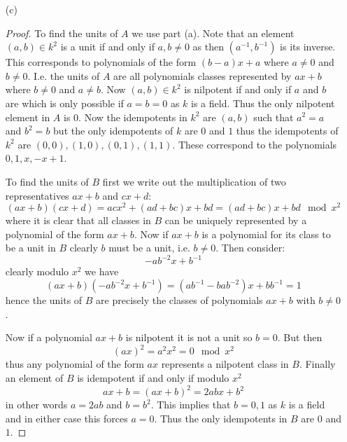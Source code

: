 \documentclass[12pt]{article}
\begin{document}
\begin{enumerate}
\begin{proof}
        Now to find the ideals of $B$ we apply a similar argument only to the polynomial $x^2$
        and from this we find it has monic divisors $1, x, x^2$ corresponding to ideals of $B$
        $(0), (x)/(x^2), B$ where the middle ideal is maximal as
        \[ k \cong k[x]/\langle x\rangle \cong \frac{k[x]/\langle x^2 \rangle}{\langle x \rangle /\langle x^2 \rangle} \cong \frac{B}{\langle x \rangle / \langle x^2 \rangle} \]
        and the other two are neither prime nor maximal. To see that $(0)$ is not prime note that $[x][x] = [x^2] = 0$
        hence $B$ has zero divisors and so $(0)$ cannot be prime.
    \end{proof}

    \item[(c)]
    \begin{proof}
        To find the units of $A$ we use part (a). Note that an element $(a, b) \in k^2$
        is a unit if and only if $a, b \neq 0$ as then $(a^{-1}, b^{-1})$ is its inverse.
        This corresponds to polynomials of the form $(b-a)x + a$ where $a \neq 0$
        and $b \neq 0$. I.e. the units of $A$ are all polynomials classes represented by $ax + b$
        where $b \neq 0$ and $a \neq b$. Now $(a, b) \in k^2$ is nilpotent if and only if $a$ and $b$ are
        which is only possible if $a = b = 0$ as $k$ is a field. Thus the only nilpotent element in $A$
        is $0$. Now the idempotents in $k^2$ are $(a, b)$ such that $a^2 = a$ and $b^2 = b$
        but the only idempotents of $k$ are $0$ and $1$ thus the idempotents of $k^2$ are
        $(0, 0), (1, 0), (0, 1), (1, 1)$. These correspond to the polynomials
        $0, 1, x, -x + 1$.

        To find the units of $B$ first we write out the multiplication of two representatives
        $ax + b$ and $cx + d$:
        \[ (ax + b)(cx + d) = acx^2 + (ad + bc)x + bd = (ad + bc)x + bd \mod x^2 \]
        where it is clear that all classes in $B$ can be uniquely represented by a polynomial of the form $ax + b$.
        Now if $ax + b$ is a polynomial for its class to be a unit in $B$ clearly $b$ must be a unit, i.e. $b \neq 0$.
        Then consider:
        \[ -ab^{-2}x + b^{-1} \]
        clearly modulo $x^2$ we have
        \[  (ax + b)(-ab^{-2}x + b^{-1}) = (ab^{-1} - bab^{-2})x + bb^{-1} = 1 \]
        hence the units of $B$ are precisely the classes of polynomials $ax + b$ with $b \neq 0$.

        Now if a polynomial $ax + b$ is nilpotent it is not a unit so $b = 0$. But then
        \[ (ax)^2 = a^2x^2 = 0 \mod x^2 \]
        thus any polynomial of the form $ax$ represents a nilpotent class in $B$.
        Finally an element of $B$ is idempotent if and only if modulo $x^2$
        \[ ax + b = (ax + b)^2 = 2abx + b^2 \]
        in other words $a = 2ab$ and $b = b^2$. This implies that $b = 0, 1$
        as $k$ is a field and in either case this forces $a = 0$. Thus the only idempotents
        in $B$ are $0$ and $1$.
    \end{proof}


\end{enumerate}
\end{document}
